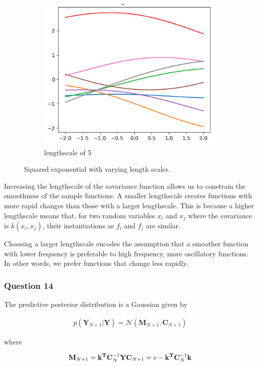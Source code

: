 \documentclass[10pt, a4paper, twocolumn]{article} %
\begin{document}
\begin{figure}[htb]
\begin{subfigure}{.5\linewidth}
\includegraphics[width=0.9\linewidth]{ls5.png}
\caption{lengthscale of 5}
\end{subfigure}
\caption{Squared exponential with varying length scales. }
\label{fig:q13}
\end{figure}

Increasing the lengthscale of the covariance function allows us to constrain the smoothness of the sample functions. A smaller lengthscale creates functions with more rapid changes than those with a larger lengthscale. This is because a higher lengthscale means that, for two random variables $x_i$ and $x_j$ where the covariance is $k(x_i, x_j)$, their instantiations as $f_i$ and $f_j$ are similar. 

Choosing a larger lengthscale encodes the assumption that a smoother function with lower frequency is preferable to high frequency, more oscillatory functions. In other words, we prefer functions that change less rapidly.

\subsubsection{Question 14}

The predictive posterior distribution is a Gaussian given by 

\begin{align}
  p(\mathbf{Y}_{N+1}|\mathbf{Y}) = \mathcal{N}(\mathbf{M}_{N+1}, \mathbf{C}_{N+1})
\end{align}

where

\begin{equation}
  \mathbf{M}_{N+1} = \mathbf{k^T}\mathbf{C}_N^{-1}\mathbf{Y} \\
  \mathbf{C}_{N+1} = c - \mathbf{k^T}\mathbf{C}_N^{-1}\mathbf{k} 
\end{equation}
\end{document}
